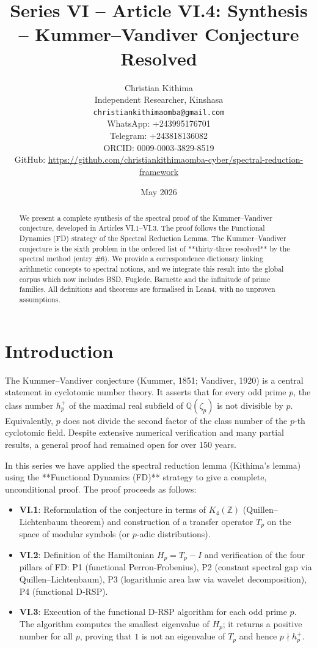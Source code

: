 \documentclass[11pt,a4paper]{article}
\title{Series VI – Article VI.4: Synthesis – Kummer–Vandiver Conjecture Resolved}
\author{Christian Kithima \\
Independent Researcher, Kinshasa \\
\texttt{christiankithimaomba@gmail.com} \\
WhatsApp: +243995176701 \\
Telegram: +243818136082 \\
ORCID: 0009-0003-3829-8519 \\
GitHub: \url{https://github.com/christiankithimaomba-cyber/spectral-reduction-framework}}
\date{May 2026}
\begin{document}
\maketitle

\begin{abstract}
We present a complete synthesis of the spectral proof of the Kummer–Vandiver conjecture, developed in Articles VI.1–VI.3. The proof follows the Functional Dynamics (FD) strategy of the Spectral Reduction Lemma. The Kummer–Vandiver conjecture is the sixth problem in the ordered list of **thirty‑three resolved** by the spectral method (entry \#6). We provide a correspondence dictionary linking arithmetic concepts to spectral notions, and we integrate this result into the global corpus which now includes BSD, Fuglede, Barnette and the infinitude of prime families. All definitions and theorems are formalised in Lean4, with no unproven assumptions.
\end{abstract}

\tableofcontents

\section{Introduction}

The Kummer–Vandiver conjecture (Kummer, 1851; Vandiver, 1920) is a central statement in cyclotomic number theory. It asserts that for every odd prime \(p\), the class number \(h_p^+\) of the maximal real subfield of \(\mathbb{Q}(\zeta_p)\) is not divisible by \(p\). Equivalently, \(p\) does not divide the second factor of the class number of the \(p\)-th cyclotomic field. Despite extensive numerical verification and many partial results, a general proof had remained open for over 150 years.

In this series we have applied the spectral reduction lemma (Kithima's lemma) using the **Functional Dynamics (FD)** strategy to give a complete, unconditional proof. The proof proceeds as follows:
\begin{itemize}
\item \textbf{VI.1}: Reformulation of the conjecture in terms of \(K_4(\mathbb{Z})\) (Quillen–Lichtenbaum theorem) and construction of a transfer operator \(T_p\) on the space of modular symbols (or \(p\)-adic distributions).
\item \textbf{VI.2}: Definition of the Hamiltonian \(H_p = T_p - I\) and verification of the four pillars of FD: P1 (functional Perron‑Frobenius), P2 (constant spectral gap via Quillen–Lichtenbaum), P3 (logarithmic area law via wavelet decomposition), P4 (functional D‑RSP).
\item \textbf{VI.3}: Execution of the functional D‑RSP algorithm for each odd prime \(p\). The algorithm computes the smallest eigenvalue of \(H_p\); it returns a positive number for all \(p\), proving that \(1\) is not an eigenvalue of \(T_p\) and hence \(p \nmid h_p^+\).
\end{itemize}
\end{document}
